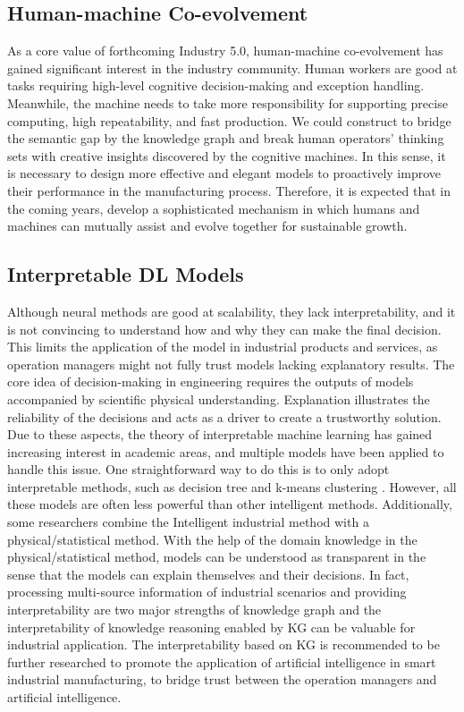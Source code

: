 \documentclass[11pt]{article}
\begin{document}
\subsection{Human-machine Co-evolvement}
\par{As a core value of forthcoming Industry 5.0, human-machine co-evolvement has gained significant interest in the industry community.
Human workers are good at tasks requiring high-level cognitive decision-making and exception handling.
Meanwhile, the machine needs to take more responsibility for supporting precise computing, high repeatability, and fast production.
We could construct to bridge the semantic gap by the knowledge graph and break human operators' thinking sets with creative insights discovered by the cognitive machines.
In this sense, it is necessary to design more effective and elegant models to proactively improve their performance in the manufacturing process.
Therefore, it is expected that in the coming years, develop a sophisticated mechanism in which humans and machines can mutually assist and evolve together for sustainable growth.}



\subsection{Interpretable DL Models}
\par{Although neural methods are good at scalability, they lack interpretability, and it is not convincing to understand how and why they can make the final decision.
This limits the application of the model in industrial products and services, as operation managers might not fully trust models lacking explanatory results.
The core idea of decision-making in engineering requires the outputs of models accompanied by scientific physical understanding.
Explanation illustrates the reliability of the decisions and acts as a driver to create a trustworthy solution.
Due to these aspects, the theory of interpretable machine learning has gained increasing interest in academic areas, and multiple models have been applied to handle this issue.
One straightforward way to do this is to only adopt interpretable methods, such as decision tree \cite{bib64} and k-means clustering \cite{bib65}.
However, all these models are often less powerful than other intelligent methods.
Additionally, some researchers combine the Intelligent industrial method with a physical/statistical method.
With the help of the domain knowledge in the physical/statistical method, models can be understood as transparent in the sense that the models can explain themselves and their decisions.
In fact, processing multi-source information of industrial scenarios and providing interpretability are two major strengths of knowledge graph and the interpretability of knowledge reasoning enabled by KG can be valuable for industrial application.
The interpretability based on KG is recommended to be further researched to promote the application of artificial intelligence in smart industrial manufacturing, to bridge trust between the operation managers and artificial intelligence.}
\end{document}
